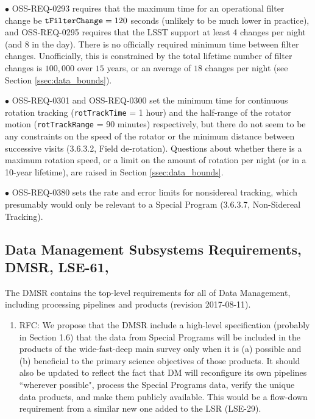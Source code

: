 \documentclass[DM,lsstdraft,toc]{lsstdoc}
\begin{document}
$\bullet$ OSS-REQ-0293 requires that the maximum time for an operational filter change be ${\tt tFilterChange} = 120$ seconds (unlikely to be much lower in practice), and OSS-REQ-0295 requires that the LSST support at least 4 changes per night (and 8 in the day). There is no officially required minimum time between filter changes. Unofficially, this is constrained by the total lifetime number of filter changes is $100,000$ over $15$ years, or an average of $18$ changes per night (see Section \ref{ssec:data_bounds}).

$\bullet$ OSS-REQ-0301 and OSS-REQ-0300 set the minimum time for continuous rotation tracking ({\tt rotTrackTime} = 1 hour) and the half-range of the rotator motion ({\tt rotTrackRange} = 90 minutes) respectively, but there do not seem to be any constraints on the speed of the rotator or the minimum distance between successive visits (3.6.3.2, Field de-rotation). Questions about whether there is a maximum rotation speed, or a limit on the amount of rotation per night (or in a 10-year lifetime), are raised in Section \ref{ssec:data_bounds}.

$\bullet$ OSS-REQ-0380 sets the rate and error limits for nonsidereal tracking, which presumably would only be relevant to a Special Program (3.6.3.7, Non-Sidereal Tracking).


\subsection{Data Management Subsystems Requirements, DMSR, LSE-61, \cite{LSE-61}}\label{ssec:docrev_dmsr}

The DMSR contains the top-level requirements for all of Data Management, including processing pipelines and products (revision 2017-08-11).

\begin{enumerate}[resume,topsep=-10pt,after=\vspace{10pt},label= \textbf{Action \Roman*}] \item \label{DMSR-0} RFC: We propose that the DMSR include a high-level specification (probably in Section 1.6) that the data from Special Programs will be included in the products of the wide-fast-deep main survey only when it is (a) possible and (b) beneficial to the primary science objectives of those products. It should also be updated to reflect the fact that DM will reconfigure its own pipelines ``wherever possible", process the Special Programs data, verify the unique data products, and make them publicly available. This would be a flow-down requirement from a similar new one added to the LSR (LSE-29).  \end{enumerate}
\end{document}
